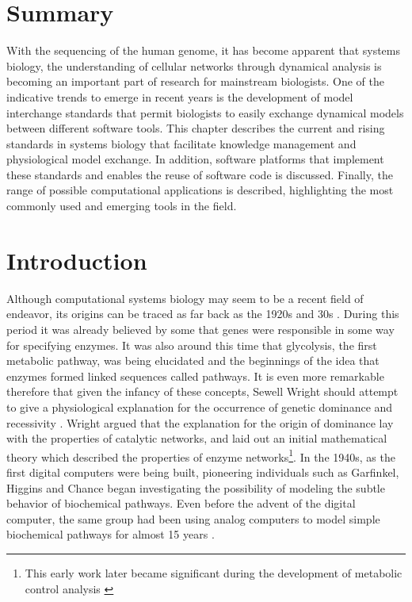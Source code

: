 \documentclass[]{article}
\begin{document}
\newcommand{\bv}{\mbox{\boldmath $v$}}

\newcommand{\bp}{\mbox{\boldmath $p$}}

\newpage
\tableofcontents
\newpage

\section{Summary}

With the sequencing of the human genome, it has become apparent that
systems biology, the understanding of cellular networks through
dynamical analysis is becoming an important part of research for
mainstream biologists. One of the indicative trends to emerge in recent
years is the development of model interchange standards that permit
biologists to easily exchange dynamical models between different
software tools. This chapter describes the current and rising standards
in systems biology that facilitate knowledge management and
physiological model exchange. In addition, software platforms that
implement these standards and enables the reuse of software code is
discussed. Finally, the range of possible computational applications is
described, highlighting the most commonly used and emerging tools in the
field.

\section{Introduction}

Although computational systems biology may seem to be a recent field of
endeavor, its origins can be traced as far back as the 1920s and 30s
\autocite{Wright1929}. During this period it was already believed by
some that genes were responsible in some way for specifying enzymes. It
was also around this time that glycolysis, the first metabolic pathway,
was being elucidated and the beginnings of the idea that enzymes formed
linked sequences called pathways. It is even more remarkable therefore
that given the infancy of these concepts, Sewell Wright should attempt
to give a physiological explanation for the occurrence of genetic
dominance and recessivity \autocite{Wright1934}. Wright argued that the
explanation for the origin of dominance lay with the properties of
catalytic networks, and laid out an initial mathematical theory which
described the properties of enzyme networks\footnote{This early work
  later became significant during the development of metabolic control
  analysis \autocite{KB81}}. In the 1940s, as the first digital
computers were being built, pioneering individuals such as Garfinkel,
Higgins and Chance began investigating the possibility of modeling the
subtle behavior of biochemical pathways. Even before the advent of the
digital computer, the same group had been using analog computers to
model simple biochemical pathways for almost 15 years
\autocites{Ga61}{Hi59}{Chance1943}.
\end{document}
